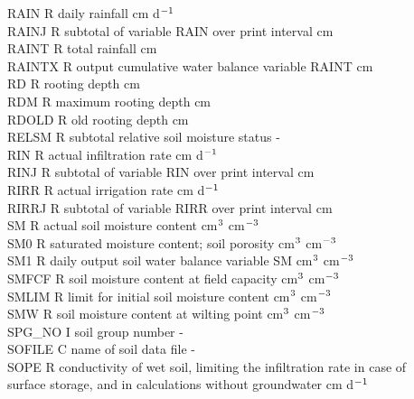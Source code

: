\begin{tabbing}
RAIN\> \> R\> daily rainfall\> \> \> \> \> \> \> cm d$^{{\rm -1}}$\\
RAINJ\> \> R\> subtotal of variable RAIN over print interval\> \> \> \> \> \> \> cm\\
RAINT\> \> R\> total rainfall\> \> \> \> \> \> \> cm\\
RAINTX\> \> R\> output cumulative water balance variable RAINT\> \> \> \> \> \> \> cm\\
RD\> \> R\> rooting depth\> \> \> \> \> \> \> cm\\
RDM\> \> R\> maximum rooting depth\> \> \> \> \> \> \> cm\\
RDOLD\> \> R\> old rooting depth\> \> \> \> \> \> \> cm\\
 RELSM\> \> \> R\> subtotal relative soil moisture status\> \> \> \> \> \> -\\
RIN\> \> R\> actual infiltration rate\> \> \> \> \> \> \> cm d$^{{\rm -1}}$\\
RINJ\> \> R\> subtotal of variable RIN over print interval\> \> \> \> \> \> \> cm\\
RIRR\> \> R\> actual irrigation rate\> \> \> \> \> \> \> cm d$^{{\rm -1}}$\\
RIRRJ\> \> R\> subtotal of variable RIRR over print interval\> \> \> \> \> \> \> cm\\
SM\> \> R\> actual soil moisture content\> \> \> \> \> \> \> cm$^{{\rm 3}}$ cm$^{{\rm -3}}$\\
SM0\> \> R\> saturated moisture content; soil porosity\> \> \> \> \> \> \> cm$^{{\rm 3}}$ cm$^{{\rm -3}}$\\
SM1\> \> R\> daily output soil water balance variable SM\> \> \> \> \> \> \> cm$^{{\rm 3}}$ cm$^{{\rm -3}}$\\
SMFCF\> \> R\> soil moisture content at field capacity\> \> \> \> \> \> \> cm$^{{\rm 3}}$ cm$^{{\rm -3}}$\\
SMLIM\> \> R\> limit for initial soil moisture content\> \> \> \> \> \> \> cm$^{{\rm 3}}$ cm$^{{\rm -3}}$\\
SMW\> \> R\> soil moisture content at wilting point\> \> \> \> \> \> \> cm$^{{\rm 3}}$ cm$^{{\rm -3}}$\\
SPG\_NO\> \> I\> soil group number\> \> \> \> \> \> \> -\\
SOFILE\> \> C\> name of soil data file\> \> \> \> \> \> \> -\\
SOPE\> \> R\> conductivity of wet soil, limiting the infiltration rate in case of \\
\>\> \> surface storage, and in calculations without groundwater \> \> \> \> \> \> \> cm d$^{{\rm -1}}$\\

\end{tabbing}
